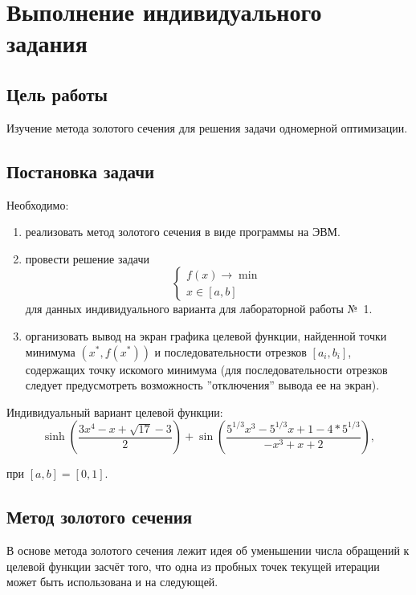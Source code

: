 \chapter{Выполнение индивидуального задания}

\section{Цель работы}

Изучение метода золотого сечения для решения задачи одномерной оптимизации.

\section{Постановка задачи}

Необходимо:
\begin{enumerate}
\item реализовать метод золотого сечения в виде программы на ЭВМ.
\item провести решение задачи
\begin{equation*}
\begin{cases}
f(x) \rightarrow \min \\
x \in [a, b]
\end{cases}
\end{equation*}
для данных индивидуального варианта для лабораторной работы №~1.
\item организовать вывод на экран графика целевой функции, найденной точки минимума $(x^* , f (x^*))$ и последовательности отрезков $[a_i, b_i]$, содержащих точку искомого минимума (для последовательности отрезков следует предусмотреть возможность ”отключения” вывода ее на экран).
\end{enumerate}

Индивидуальный вариант целевой функции:
\begin{equation*}
\sinh\left(\frac{3x^4 - x + \sqrt{17} - 3}{2}\right)+\sin\left(\frac{5^{1/3}x^3 - 5^{1/3}x + 1 - 4*5^{1/3}}{-x^3 + x + 2}\right),
\end{equation*}

при $[a, b] = [0, 1]$.

\section*{Метод золотого сечения}

В основе метода золотого сечения лежит идея об уменьшении числа обращений к целевой функции засчёт того, что одна из пробных точек текущей итерации может быть использована и на следующей.

